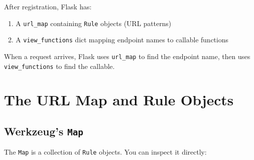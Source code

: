 \noindent{}After registration, Flask has:

\begin{enumerate}
\def\labelenumi{\arabic{enumi}.}
\tightlist
\item
  A \texttt{url\_map} containing \texttt{Rule} objects (URL patterns)
\item
  A \texttt{view\_functions} dict mapping endpoint names to callable functions
\end{enumerate}

\noindent{}When a request arrives, Flask uses \texttt{url\_map} to find the endpoint name, then uses \texttt{view\_functions} to find the callable.

\setcounter{section}{1}
\section{The URL Map and Rule Objects}\label{32-routing:322-the-url-map-and-rule-objects}

\subsection*{\texorpdfstring{Werkzeug's \texttt{Map}}{Werkzeug's Map}}\label{32-routing:werkzeugs-map}

The \texttt{Map} is a collection of \texttt{Rule} objects. You can inspect it directly:

\begin{codebox}[short]

\begin{Shaded}
\begin{Highlighting}[]
\OperatorTok{=}

    \NormalTok{(}\SpecialCharTok{\{}\SpecialStringTok{  }\SpecialCharTok{\{}\StringTok{\textquotesingle{},\textquotesingle{}}\SpecialStringTok{  }\SpecialCharTok{\{}\SpecialCharTok{\}}\NormalTok{)}
\end{Highlighting}
\end{Shaded}

\end{codebox}

